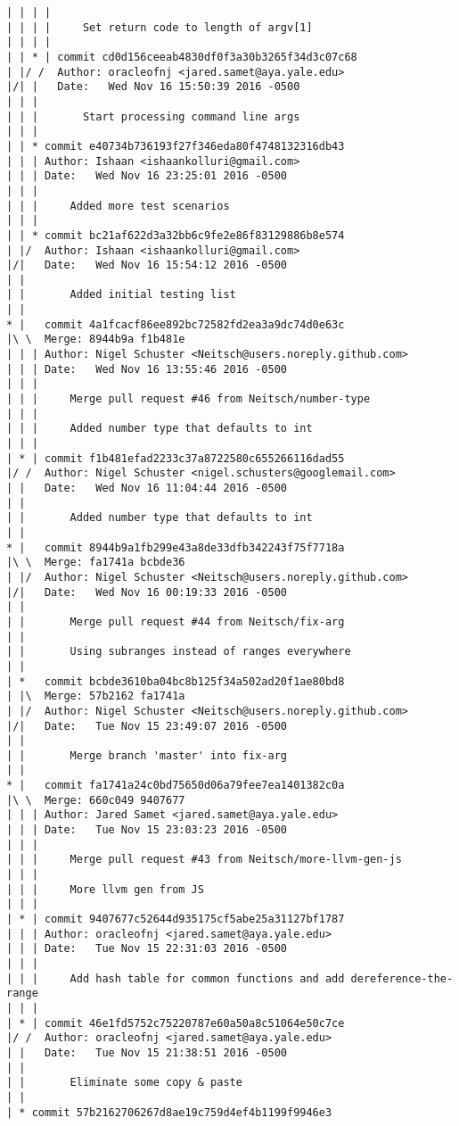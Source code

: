 \begin{lstlisting}
| | | | 
| | | |     Set return code to length of argv[1]
| | | |     
| | * | commit cd0d156ceeab4830df0f3a30b3265f34d3c07c68
| |/ /  Author: oracleofnj <jared.samet@aya.yale.edu>
|/| |   Date:   Wed Nov 16 15:50:39 2016 -0500
| | |   
| | |       Start processing command line args
| | |    
| | * commit e40734b736193f27f346eda80f4748132316db43
| | | Author: Ishaan <ishaankolluri@gmail.com>
| | | Date:   Wed Nov 16 23:25:01 2016 -0500
| | | 
| | |     Added more test scenarios
| | |    
| | * commit bc21af622d3a32bb6c9fe2e86f83129886b8e574
| |/  Author: Ishaan <ishaankolluri@gmail.com>
|/|   Date:   Wed Nov 16 15:54:12 2016 -0500
| |   
| |       Added initial testing list
| |     
* |   commit 4a1fcacf86ee892bc72582fd2ea3a9dc74d0e63c
|\ \  Merge: 8944b9a f1b481e
| | | Author: Nigel Schuster <Neitsch@users.noreply.github.com>
| | | Date:   Wed Nov 16 13:55:46 2016 -0500
| | | 
| | |     Merge pull request #46 from Neitsch/number-type
| | |     
| | |     Added number type that defaults to int
| | |    
| * | commit f1b481efad2233c37a8722580c655266116dad55
|/ /  Author: Nigel Schuster <nigel.schusters@googlemail.com>
| |   Date:   Wed Nov 16 11:04:44 2016 -0500
| |   
| |       Added number type that defaults to int
| |     
* |   commit 8944b9a1fb299e43a8de33dfb342243f75f7718a
|\ \  Merge: fa1741a bcbde36
| |/  Author: Nigel Schuster <Neitsch@users.noreply.github.com>
|/|   Date:   Wed Nov 16 00:19:33 2016 -0500
| |   
| |       Merge pull request #44 from Neitsch/fix-arg
| |       
| |       Using subranges instead of ranges everywhere
| |     
| *   commit bcbde3610ba04bc8b125f34a502ad20f1ae80bd8
| |\  Merge: 57b2162 fa1741a
| |/  Author: Nigel Schuster <Neitsch@users.noreply.github.com>
|/|   Date:   Tue Nov 15 23:49:07 2016 -0500
| |   
| |       Merge branch 'master' into fix-arg
| |     
* |   commit fa1741a24c0bd75650d06a79fee7ea1401382c0a
|\ \  Merge: 660c049 9407677
| | | Author: Jared Samet <jared.samet@aya.yale.edu>
| | | Date:   Tue Nov 15 23:03:23 2016 -0500
| | | 
| | |     Merge pull request #43 from Neitsch/more-llvm-gen-js
| | |     
| | |     More llvm gen from JS
| | |    
| * | commit 9407677c52644d935175cf5abe25a31127bf1787
| | | Author: oracleofnj <jared.samet@aya.yale.edu>
| | | Date:   Tue Nov 15 22:31:03 2016 -0500
| | | 
| | |     Add hash table for common functions and add dereference-the-range
| | |    
| * | commit 46e1fd5752c75220787e60a50a8c51064e50c7ce
|/ /  Author: oracleofnj <jared.samet@aya.yale.edu>
| |   Date:   Tue Nov 15 21:38:51 2016 -0500
| |   
| |       Eliminate some copy & paste
| |   
| * commit 57b2162706267d8ae19c759d4ef4b1199f9946e3

\end{lstlisting}
